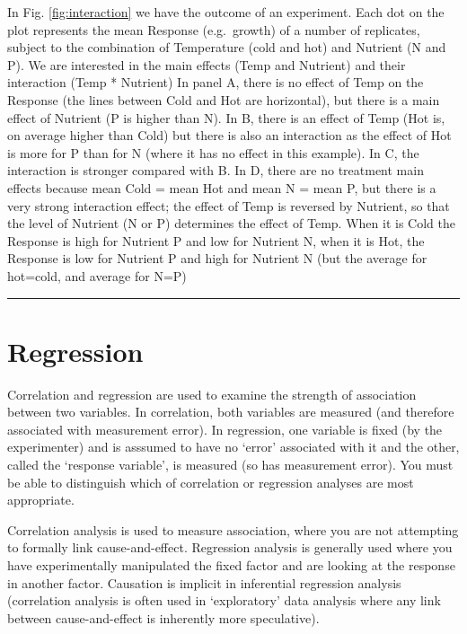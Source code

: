 \documentclass[
  11pt,
  a4paper,
]{book}
\begin{document}
In Fig. \ref{fig:interaction} we have the outcome of an experiment. Each dot on the plot represents the mean Response (e.g.~growth) of a number of replicates, subject to the combination of Temperature (cold and hot) and Nutrient (N and P). We are interested in the main effects (Temp and Nutrient) and their interaction (Temp * Nutrient) In panel A, there is no effect of Temp on the Response (the lines between Cold and Hot are horizontal), but there is a main effect of Nutrient (P is higher than N). In B, there is an effect of Temp (Hot is, on average higher than Cold) but there is also an interaction as the effect of Hot is more for P than for N (where it has no effect in this example). In C, the interaction is stronger compared with B. In D, there are no treatment main effects because mean Cold = mean Hot and mean N = mean P, but there is a very strong interaction effect; the effect of Temp is reversed by Nutrient, so that the level of Nutrient (N or P) determines the effect of Temp. When it is Cold the Response is high for Nutrient P and low for Nutrient N, when it is Hot, the Response is low for Nutrient P and high for Nutrient N (but the average for hot=cold, and average for N=P)

\begin{center}\rule{0.5\linewidth}{0.5pt}\end{center}

\hypertarget{regression}{%
\section{Regression}\label{regression}}

Correlation and regression are used to examine the strength of association between two variables. In correlation, both variables are measured (and therefore associated with measurement error). In regression, one variable is fixed (by the experimenter) and is asssumed to have no `error' associated with it and the other, called the `response variable', is measured (so has measurement error). You must be able to distinguish which of correlation or regression analyses are most appropriate.

Correlation analysis is used to measure association, where you are not attempting to formally link cause-and-effect. Regression analysis is generally used where you have experimentally manipulated the fixed factor and are looking at the response in another factor. Causation is implicit in inferential regression analysis (correlation analysis is often used in `exploratory' data analysis where any link between cause-and-effect is inherently more speculative).
\end{document}
